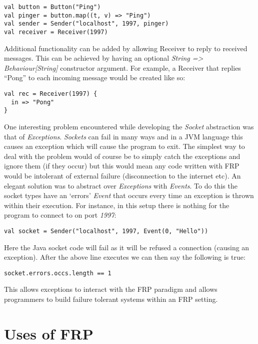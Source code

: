 \documentclass[12pt]{article}
\begin{document}
\begin{verbatim}
val button = Button("Ping")
val pinger = button.map((t, v) => "Ping")
val sender = Sender("localhost", 1997, pinger)
val receiver = Receiver(1997)
\end{verbatim}
    
    Additional functionality can be added by allowing Receiver to reply to received messages. This can be achieved by
    having an optional \emph{String => Behaviour[String]} constructor argument. For example, a Receiver that replies
    ``Pong'' to each incoming message would be created like so:
 
\begin{verbatim}
val rec = Receiver(1997) {
  in => "Pong"
}
\end{verbatim}    

    One interesting problem encountered while developing the \emph{Socket} abstraction was that of \emph{Exceptions}. 
    \emph{Sockets} can fail in many ways and in a JVM language this causes an exception which will cause the program to exit. 
    The simplest way to deal with the problem would of course be to simply catch the exceptions and ignore them (if they 
    occur) but this would mean any code written with FRP would be intolerant of external failure (disconnection to the 
    internet etc). An elegant solution was to abstract over \emph{Exceptions} with \emph{Events}. To do this the socket types 
    have an `errors' \emph{Event} that occurs every time an exception is thrown within their execution. For instance, in this 
    setup there is nothing for the program to connect to on port \emph{1997}:

\begin{verbatim}
val socket = Sender("localhost", 1997, Event(0, "Hello")) 
\end{verbatim}

    Here the Java socket code will fail as it will be refused a connection (causing an exception). After the above line 
    executes we can then say the following is true:

\begin{verbatim}
socket.errors.occs.length == 1 
\end{verbatim}

    This allows exceptions to interact with the FRP paradigm and allows programmers to build failure tolerant systems within 
    an FRP setting.
    
  \section{Uses of FRP}
  
\end{document}
